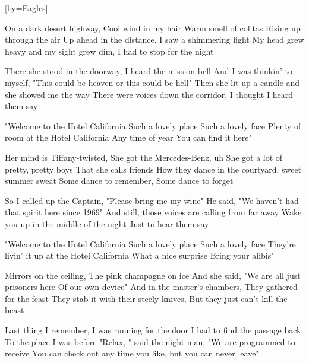 [by={Eagles}]

  \chordsoff

  \beginverse
  On a dark desert highway,
  Cool wind in my hair
  Warm smell of colitas
  Rising up through the air
  Up ahead in the distance,
  I saw a shimmering light
  My head grew heavy and my sight grew dim,
  I had to stop for the night
  \endverse

  \beginverse
  There she stood in the doorway,
  I heard the mission bell
  And I was thinkin' to myself,
  "This could be heaven or this could be hell"
  Then she lit up a candle
  and she showed me the way
  There were voices down the corridor,
  I thought I heard them say
  \endverse
  
  \beginchorus
  
  "Welcome to the Hotel California
  Such a lovely place
  Such a lovely face
  Plenty of room at the Hotel California
  Any time of year
  You can find it here"
  \endchorus

  \beginverse
  Her mind is Tiffany-twisted,
  She got the Mercedes-Benz, uh
  She got a lot of pretty, pretty boys
  That she calls friends
  How they dance in the courtyard, sweet summer sweat
  Some dance to remember,
  Some dance to forget
  \endverse

  \beginverse
  So I called up the Captain,
  "Please bring me my wine"
  He said, "We haven't had that spirit here
  since 1969"
  And still, those voices are calling from far away
  Wake you up in the middle of the night
  Just to hear them say
  \endverse

  \beginchorus
  "Welcome to the Hotel California
  Such a lovely place
  Such a lovely face
  They're livin' it up at the Hotel California
  What a nice surprise
  Bring your alibis"
  \endchorus

  \beginverse
  Mirrors on the ceiling,
  The pink champagne on ice
  And she said, "We are all just prisoners here
  Of our own device"
  And in the master's chambers,
  They gathered for the feast
  They stab it with their steely knives,
  But they just can't kill the beast
  \endverse

  \beginverse
  Last thing I remember,
  I was running for the door
  I had to find the passage back
  To the place I was before
  "Relax, " said the night man,
  "We are programmed to receive
  You can check out any time you like,
  but you can never leave"
  \endverse
\endsong

